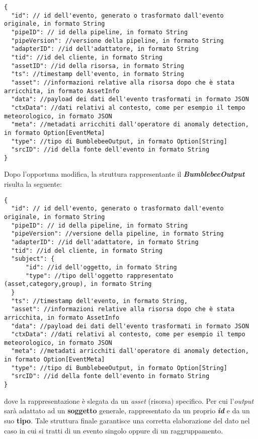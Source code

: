 \begin{verbatim}
{
  "id": // id dell'evento, generato o trasformato dall'evento originale, in formato String
  "pipeID": // id della pipeline, in formato String
  "pipeVersion": //versione della pipeline, in formato String
  "adapterID": //id dell'adattatore, in formato String
  "tid": //id del cliente, in formato String
  "assetID": //id della risorsa, in formato String
  "ts": //timestamp dell'evento, in formato String
  "asset": //informazioni relative alla risorsa dopo che è stata arricchita, in formato AssetInfo
  "data": //payload dei dati dell'evento trasformati in formato JSON
  "ctxData": //dati relativi al contesto, come per esempio il tempo meteorologico, in formato JSON
  "meta": //metadati arricchiti dall'operatore di anomaly detection, in formato Option[EventMeta]
  "type": //tipo di BumblebeeOutput, in formato Option[String]
  "srcID": //id della fonte dell'evento in formato String
}
\end{verbatim}

Dopo l'opportuna modifica, la struttura rappresentante il \textbf{\textit{BumblebeeOutput}} risulta la seguente:

\begin{verbatim}
{
  "id": // id dell'evento, generato o trasformato dall'evento originale, in formato String
  "pipeID": // id della pipeline, in formato String
  "pipeVersion": //versione della pipeline, in formato String
  "adapterID": //id dell'adattatore, in formato String
  "tid": //id del cliente, in formato String
  "subject": {
	  "id": //id dell'oggetto, in formato String
	  "type": //tipo dell'oggetto rappresentato (asset,category,group), in formato String
  }
  "ts": //timestamp dell'evento, in formato String,
  "asset": //informazioni relative alla risorsa dopo che è stata arricchita, in formato AssetInfo
  "data": //payload dei dati dell'evento trasformati in formato JSON
  "ctxData": //dati relativi al contesto, come per esempio il tempo meteorologico, in formato JSON
  "meta": //metadati arricchiti dall'operatore di anomaly detection, in formato Option[EventMeta]
  "type": //tipo di BumblebeeOutput, in formato Option[String]
  "srcID": //id della fonte dell'evento in formato String
}
\end{verbatim}
dove la rappresentazione è slegata da un \textit{asset} (risorsa) specifico. Per cui l'\textit{output} sarà adattato ad un \textbf{soggetto} generale, rappresentato da un proprio \textbf{\textit{id}} e da un suo \textbf{tipo}.
Tale struttura finale garantisce una corretta elaborazione del dato nel caso in cui si tratti di un evento singolo oppure di un raggruppamento.

